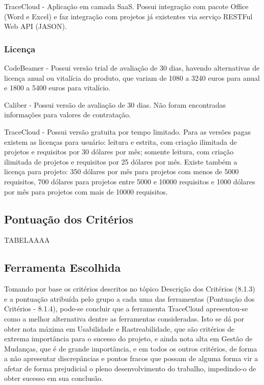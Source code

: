 TraceCloud - Aplicação em camada SaaS. Possui integração com pacote Office (Word e Excel) e faz integração com projetos já existentes via serviço RESTFul Web API (JASON).

\subsubsection{Licença}

CodeBeamer - Possui versão trial de avaliação de 30 dias, havendo alternativas de licença anual ou vitalícia do produto, que variam de 1080 a 3240 euros para anual e 1800 a 5400 euros para vitalício.

Caliber - Possui versão de avaliação de 30 dias. Não foram encontradas informações para valores de contratação.

TraceCloud - Possui versão gratuita por tempo limitado. Para as versões pagas existem as licenças para usuário: leitura e estrita, com criação ilimitada de projetos e requisitos por 30 dólares por mês; somente leitura, com criação ilimitada de projetos e requisitos por 25 dólares por mês. Existe também a licença para projeto: 350 dólares por mês para projetos com menos de 5000 requisitos, 700 dólares para projetos entre 5000 e 10000 requisitos e 1000 dólares por mês para projetos com mais de 10000 requisitos.

\subsection{Pontuação dos Critérios}

TABELAAAA


\subsection{Ferramenta Escolhida}

Tomando por base os critérios descritos no tópico Descrição dos Critérios (8.1.3) e a pontuação atribuída pelo grupo a cada uma das ferramentas (Pontuação dos Critérios - 8.1.4), pode-se concluir que a ferramenta TraceCloud apresentou-se como a melhor alternativa dentre as ferramentas consideradas. Isto se dá por obter nota máxima em Usabilidade e Rastreabilidade, que são critérios de extrema importância para o sucesso do projeto, e ainda nota alta em Gestão de Mudanças, que é de grande importância, e em todos os outros critérios, de forma a não apresentar discrepâncias e pontos fracos que possam de alguma forma vir a afetar de forma prejudicial o pleno desenvolvimento do trabalho, impedindo-o de obter sucesso em sua conclusão.
